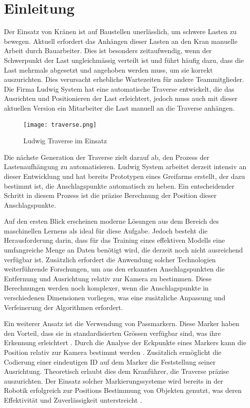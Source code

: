 \section{Einleitung}

Der Einsatz von Kränen ist auf Baustellen unerlässlich, um schwere Lasten zu bewegen.
Aktuell erfordert das Anhängen dieser Lasten an den Kran manuelle Arbeit durch Bauarbeiter.
Dies ist besonders zeitaufwendig, wenn der Schwerpunkt der Last ungleichmässig verteilt ist 
und führt häufig dazu, dass die Last mehrmals abgesetzt und angehoben werden muss, um sie 
korrekt auszurichten. Dies verursacht erhebliche Wartezeiten für andere Teammitglieder. 
Die Firma Ludwig System hat eine automatische Traverse entwickelt, die das Ausrichten und 
Positionieren der Last erleichtert, jedoch muss auch mit dieser aktuellen Version ein Mitarbeiter 
die Last manuell an die Traverse anhängen.

\begin{figure}[H]
    \centering
    \texttt{[image: traverse.png]}
    \caption{Ludwig Traverse im Einsatz}
\end{figure}

Die nächste Generation der Traverse zielt darauf ab, den Prozess der Lastenaufhängung zu automatisieren.
Ludwig System arbeitet derzeit intensiv an dieser Entwicklung und hat bereits Prototypen eines Greifarms 
erstellt, der dazu bestimmt ist, die Anschlagspunkte automatisch zu heben. Ein entscheidender Schritt in diesem 
Prozess ist die präzise Berechnung der Position dieser Anschlagspunkte.

Auf den ersten Blick erscheinen moderne Lösungen aus dem Bereich des maschinellen Lernens als ideal für diese Aufgabe. 
Jedoch besteht die Herausforderung darin, dass für das Training eines effektiven Modells eine umfangreiche Menge an Daten 
benötigt wird, die derzeit noch nicht ausreichend verfügbar ist. Zusätzlich erfordert die Anwendung solcher Technologien weiterführende 
Forschungen, um aus den erkannten Anschlagspunkten die Entfernung und Ausrichtung relativ zur Kamera zu bestimmen. Diese Berechnungen werden 
noch komplexer, wenn die Anschlagspunkte in verschiedenen Dimensionen vorliegen, was eine zusätzliche Anpassung und Verfeinerung der Algorithmen 
erfordert.

Ein weiterer Ansatz ist die Verwendung von Passmarkern. Diese Marker haben den Vorteil, dass sie in standardisierten Grössen verfügbar sind, was 
ihre Erkennung erleichtert \cite{astrobee2023}. Durch die Analyse der Eckpunkte eines Markers kann die Position relativ zur Kamera bestimmt werden 
\cite{localizationSystem}. Zusätzlich ermöglicht die Codierung einer eindeutigen ID auf dem Marker die Feststellung seiner Ausrichtung. Theoretisch
erlaubt dies dem Kranführer, die Traverse präzise auszurichten. Der Einsatz solcher Markierungssysteme wird bereits in der Robotik erfolgreich zur 
Positions Bestimmung von Objekten genutzt, was deren Effektivität und Zuverlässigkeit unterstreicht \cite{localizationSystem}.

